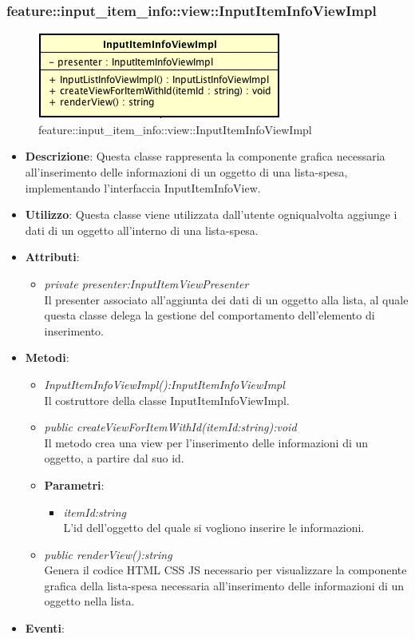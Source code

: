 \subsubsection{feature::input\_item\_info::view::InputItemInfoViewImpl}

\label{feature::input\_item\_info::view::InputItemInfoViewImpl}
\begin{figure}[ht]
	\centering
	\includegraphics[scale=0.5]{Sezioni/SottosezioniST/img/app/InputItemInfoViewImpl.png}
	\caption{feature::input\_item\_info::view::InputItemInfoViewImpl}
\end{figure}

\begin{itemize}
\item \textbf{Descrizione}: Questa classe rappresenta la componente grafica necessaria all'inserimento delle informazioni di un oggetto di una lista-spesa, implementando l'interfaccia InputItemInfoView.
\item \textbf{Utilizzo}: Questa classe viene utilizzata dall'utente ogniqualvolta aggiunge i dati di un oggetto all'interno di una lista-spesa.
\item \textbf{Attributi}:
	\begin{itemize}
	\item \textit{private presenter:InputItemViewPresenter}\\
	Il presenter associato all'aggiunta dei dati di un oggetto alla lista, al quale questa classe delega la gestione del comportamento dell'elemento di inserimento.
	\end{itemize}
\item \textbf{Metodi}:
	\begin{itemize}
	\item \textit{InputItemInfoViewImpl():InputItemInfoViewImpl}\\
	Il costruttore della classe InputItemInfoViewImpl.
	\item \textit{public createViewForItemWithId(itemId:string):void}\\
	Il metodo crea una view per l'inserimento delle informazioni di un oggetto, a partire dal suo id.
			\item{\textbf{Parametri}: \begin{itemize}
			\item \textit{itemId:string}\\
			L'id dell'oggetto del quale si vogliono inserire le informazioni.
			\end{itemize}}
	\item \textit{public renderView():string}\\
	Genera il codice HTML CSS JS necessario per visualizzare la componente grafica della lista-spesa necessaria all'inserimento delle informazioni di un oggetto nella lista.
	\end{itemize}
\item \textbf{Eventi}:
\end{itemize}

